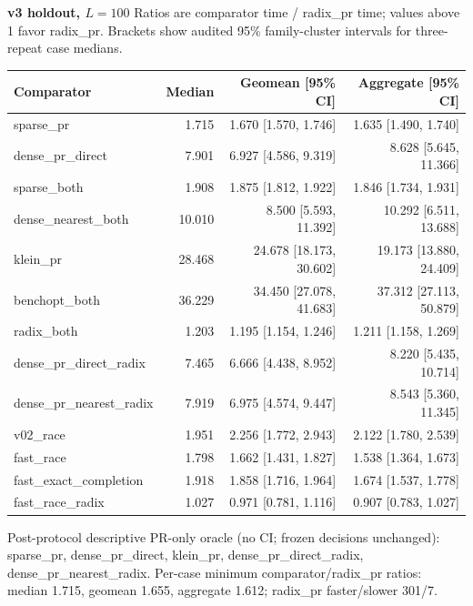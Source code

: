 \par\noindent\textbf{v3 holdout, $L=100$}
Ratios are comparator time / radix\_pr time; values above 1 favor radix\_pr.
Brackets show audited 95\% family-cluster intervals for three-repeat case medians.
\par\smallskip
\begin{tabular}{lrrr}
Comparator & Median & Geomean [95\% CI] & Aggregate [95\% CI] \\
\hline
sparse\_pr & 1.715 & 1.670 [1.570, 1.746] & 1.635 [1.490, 1.740] \\
dense\_pr\_direct & 7.901 & 6.927 [4.586, 9.319] & 8.628 [5.645, 11.366] \\
sparse\_both & 1.908 & 1.875 [1.812, 1.922] & 1.846 [1.734, 1.931] \\
dense\_nearest\_both & 10.010 & 8.500 [5.593, 11.392] & 10.292 [6.511, 13.688] \\
klein\_pr & 28.468 & 24.678 [18.173, 30.602] & 19.173 [13.880, 24.409] \\
benchopt\_both & 36.229 & 34.450 [27.078, 41.683] & 37.312 [27.113, 50.879] \\
radix\_both & 1.203 & 1.195 [1.154, 1.246] & 1.211 [1.158, 1.269] \\
dense\_pr\_direct\_radix & 7.465 & 6.666 [4.438, 8.952] & 8.220 [5.435, 10.714] \\
dense\_pr\_nearest\_radix & 7.919 & 6.975 [4.574, 9.447] & 8.543 [5.360, 11.345] \\
v02\_race & 1.951 & 2.256 [1.772, 2.943] & 2.122 [1.780, 2.539] \\
fast\_race & 1.798 & 1.662 [1.431, 1.827] & 1.538 [1.364, 1.673] \\
fast\_exact\_completion & 1.918 & 1.858 [1.716, 1.964] & 1.674 [1.537, 1.778] \\
fast\_race\_radix & 1.027 & 0.971 [0.781, 1.116] & 0.907 [0.783, 1.027] \\
\end{tabular}
\par\smallskip
Post-protocol descriptive PR-only oracle (no CI; frozen decisions unchanged): sparse\_pr, dense\_pr\_direct, klein\_pr, dense\_pr\_direct\_radix, dense\_pr\_nearest\_radix.
Per-case minimum comparator/radix\_pr ratios: median 1.715, geomean 1.655, aggregate 1.612; radix\_pr faster/slower 301/7.


